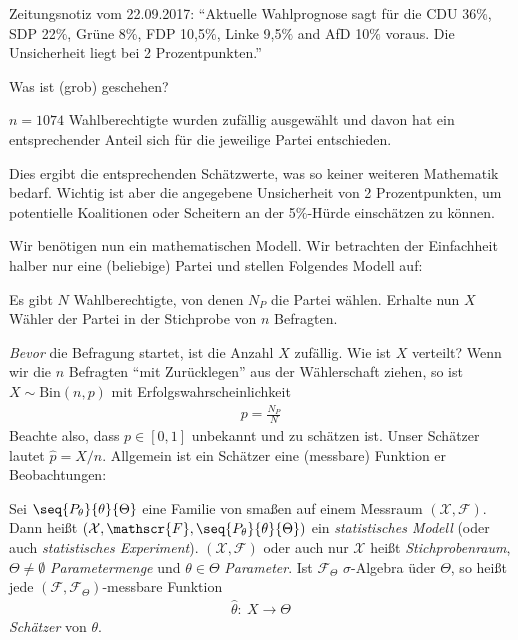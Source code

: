 \documentclass[a4paper]{scrartcl}
\begin{document}
		\begin{motivation}
			Zeitungsnotiz vom 22.09.2017: "`Aktuelle Wahlprognose sagt für die CDU 36$\%$, SDP 22$\%$, Grüne 8$\%$, FDP 10,5$\%$, Linke 9,5$\%$ and AfD 10$\%$ voraus. Die Unsicherheit liegt bei 2 Prozentpunkten."'
			
			Was ist (grob) geschehen?
			
			$n=1074$ Wahlberechtigte wurden zufällig ausgewählt und davon hat ein entsprechender Anteil sich für die jeweilige Partei entschieden.
			
			Dies ergibt die entsprechenden Schätzwerte, was so keiner weiteren Mathematik bedarf. Wichtig ist aber die angegebene Unsicherheit von 2 Prozentpunkten, um potentielle Koalitionen oder Scheitern an der 5$\%$-Hürde einschätzen zu können.
			
			Wir benötigen nun ein mathematischen Modell. Wir betrachten der Einfachheit halber nur eine (beliebige) Partei und stellen Folgendes Modell auf:
			
			Es gibt $N$ Wahlberechtigte, von denen $N_P$ die Partei wählen. Erhalte nun $X$ Wähler der Partei in der Stichprobe von $n$ Befragten.
			
			\emph{Bevor} die Befragung startet, ist die Anzahl $X$ zufällig. Wie ist $X$ verteilt? Wenn wir die $n$ Befragten "`mit Zurücklegen"' aus der Wählerschaft ziehen, so ist $X\sim \text{Bin}(n,p)$ mit Erfolgswahrscheinlichkeit
			\begin{align*}
				p=\frac{N_P}{N}
			\end{align*}
			Beachte also, dass $p\in[0,1]$ unbekannt und zu schätzen ist. Unser Schätzer lautet $\hat{p}=X/n$. Allgemein ist ein Schätzer eine (messbare) Funktion er Beobachtungen:
		\end{motivation}
		\begin{definition}
			Sei $\seq{P_\theta}{\theta}{\Theta}$ eine Familie von \Wk smaßen auf einem Messraum $(\mathcal{X},\mathscr{F})$. Dann heißt $(\mathcal{X},\mathscr{F},\seq{P_\theta}{\theta}{\Theta})$ ein \emph{statistisches Modell} (oder auch \emph{statistisches Experiment}). $(\mathcal{X},\mathscr{F})$ oder auch nur $\mathcal{X}$ heißt \emph{Stichprobenraum}, $\Theta\neq\emptyset$ \emph{Parametermenge} und $\theta\in\Theta$ \emph{Parameter}. Ist $\mathscr{F}_\Theta$ $\sigma$-Algebra üder $\Theta$, so heißt jede $(\mathscr{F},\mathscr{F}_\Theta)$-messbare Funktion
			\begin{align*}
				\hat{\theta}\colon~X\to\Theta
			\end{align*}
			\emph{Schätzer} von $\theta$.
		\end{definition}
\end{document}
